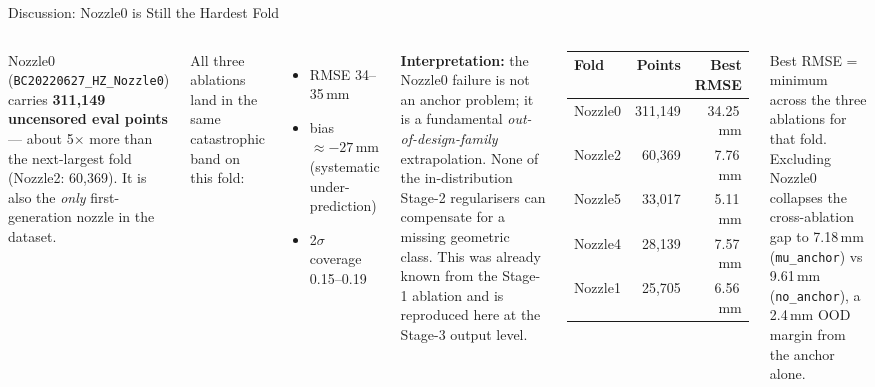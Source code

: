 \documentclass[UTF8,aspectratio=169]{ctexbeamer}
\begin{document}
\begin{frame}{Discussion: Nozzle0 is Still the Hardest Fold}
\small
\begin{columns}[T]
Nozzle0 (\texttt{BC20220627\_HZ\_Nozzle0}) carries \textbf{311{,}149 uncensored eval points}
— about 5$\times$ more than the next-largest fold (Nozzle2: 60{,}369). It is also the
\emph{only} first-generation nozzle in the dataset.

\vspace{0.5em}
All three ablations land in the same catastrophic band on this fold:
\begin{itemize}\setlength\itemsep{2pt}
  \item RMSE 34--35\,mm
  \item bias $\approx -27$\,mm (systematic under-prediction)
  \item 2$\sigma$ coverage 0.15--0.19
\end{itemize}

\vspace{0.5em}
\textbf{Interpretation:} the Nozzle0 failure is not an anchor problem; it is a fundamental
\emph{out-of-design-family} extrapolation. None of the in-distribution Stage-2 regularisers
can compensate for a missing geometric class. This was already known from the Stage-1
ablation and is reproduced here at the Stage-3 output level.

\begin{center}
\renewcommand{\arraystretch}{1.2}
\small
\begin{tabular}{@{}lrr@{}}
\toprule
\textbf{Fold} & \textbf{Points} & \textbf{Best RMSE} \\
\midrule
Nozzle0 & 311{,}149 & 34.25\,mm \\
Nozzle2 & 60{,}369  & 7.76\,mm \\
Nozzle5 & 33{,}017  & 5.11\,mm \\
Nozzle4 & 28{,}139  & 7.57\,mm \\
Nozzle1 & 25{,}705  & 6.56\,mm \\
\bottomrule
\end{tabular}
\end{center}
\vspace{0.5em}
\footnotesize
Best RMSE = minimum across the three ablations for that fold.
Excluding Nozzle0 collapses the cross-ablation gap to 7.18\,mm
(\texttt{mu\_anchor}) vs 9.61\,mm (\texttt{no\_anchor}), a 2.4\,mm OOD margin from the
anchor alone.
\end{columns}
\end{frame}
\end{document}
